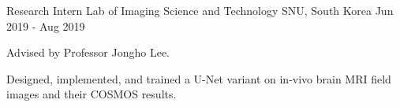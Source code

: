 \begin{cventries}
  \cventry
    {Research Intern} %
    {Lab of Imaging Science and Technology} %
    {SNU, South Korea} %
    {Jun 2019 - Aug 2019} %
    {
      \begin{cvitems} %
        \item {Advised by Professor Jongho Lee.}
        \item {Designed, implemented, and trained a U-Net variant on in-vivo brain MRI field images and their COSMOS results.}
      \end{cvitems}
    }

\end{cventries}
